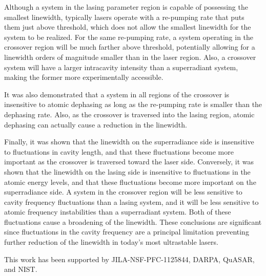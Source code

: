 \documentclass[aps,prl,twocolumn,
superscriptaddress,groupedaddress]{revtex4}
\begin{document}
Although a system in the lasing parameter region is capable of
possessing the smallest linewidth, typically lasers operate with a
re-pumping rate that puts them just above threshold, which does not
allow the smallest linewidth for the system to be realized. For the same
re-pumping rate, a system operating in the crossover region will be much
farther above threshold, potentially allowing for a linewidth orders of
magnitude smaller than in the laser region. Also, a crossover system
will have a larger intracavity intensity than a superradiant system,
making the former more experimentally accessible.


It was also demonstrated that a system in all regions of the crossover
is insensitive to atomic dephasing as long as the re-pumping rate is
smaller than the dephasing rate. Also, as the crossover is traversed
into the lasing region, atomic dephasing can actually cause a reduction
in the linewidth.

Finally, it was shown that the linewidth on the superradiance side is
insensitive to fluctuations in cavity length, and that these
fluctuations become more important as the crossover is traversed toward
the laser side. Conversely, it was shown that the linewidth on the
lasing side is insensitive to fluctuations in the atomic energy levels,
and that these fluctuations become more important on the superradiance
side. A system in the crossover region will be less sensitive to cavity
frequency fluctuations than a lasing system, and it will be less
sensitive to atomic frequency instabilities than a superradiant system.
Both of these fluctuations cause a broadening of the linewidth. These
conclusions are significant since fluctuations in the cavity frequency
are a principal limitation preventing further reduction of the linewidth
in today's most ultrastable lasers.

This work has been supported by JILA-NSF-PFC-1125844, DARPA, QuASAR, and
NIST.




\end{document}
